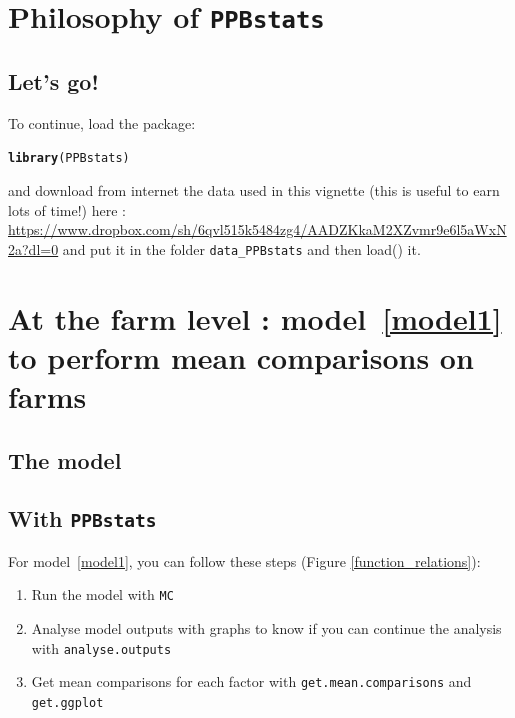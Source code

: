 \documentclass{article}\usepackage[]{graphicx}\usepackage[]{color}
\makeatletter
\newcommand{\hlstd}[1]{\textcolor[rgb]{0.345,0.345,0.345}{#1}}%
\newcommand{\hlkwd}[1]{\textcolor[rgb]{0.737,0.353,0.396}{\textbf{#1}}}%
\newenvironment{kframe}{%
 \def\at@end@of@kframe{}%
 \ifinner\ifhmode%
  \def\at@end@of@kframe{\end{minipage}}%
  \begin{minipage}{\columnwidth}%
 \fi\fi%
 \def\FrameCommand##1{\hskip\@totalleftmargin \hskip-\fboxsep
 \colorbox{shadecolor}{##1}\hskip-\fboxsep
     \hskip-\linewidth \hskip-\@totalleftmargin \hskip\columnwidth}%
 \MakeFramed {\advance\hsize-\width
   \@totalleftmargin\z@ \linewidth\hsize
   \@setminipage}}%
 {\par\unskip\endMakeFramed%
 \at@end@of@kframe}
\newenvironment{knitrout}{}{} %
\newcommand{\pack}{\texttt{PPBstats}}
\makeatother
\begin{document}


\section{Philosophy of \pack}



\subsection{Let's go!}
To continue, load the package:
\begin{knitrout}
\color{fgcolor}\begin{kframe}
\begin{alltt}
\hlkwd{library}\hlstd{(PPBstats)}
\end{alltt}
\end{kframe}
\end{knitrout}
and download from internet the data used in this vignette (this is useful to earn lots of time!) here : \url{https://www.dropbox.com/sh/6qvl515k5484zg4/AADZKkaM2XZvmr9e6l5aWxN2a?dl=0} and put it in the folder \texttt{data\_PPBstats} and then load() it.


\section{At the farm level : model~\ref{model1} to perform mean comparisons on farms }
\label{section_model1}

\subsection{The model}


\subsection{With \pack}

For model~\ref{model1}, you can follow these steps (Figure \ref{function_relations}):

\begin{enumerate}
\item Run the model with \texttt{MC}
\item Analyse model outputs with graphs to know if you can continue the analysis with \texttt{analyse.outputs}
\item Get mean comparisons for each factor with \texttt{get.mean.comparisons} and \texttt{get.ggplot}
\end{enumerate}
\end{document}
